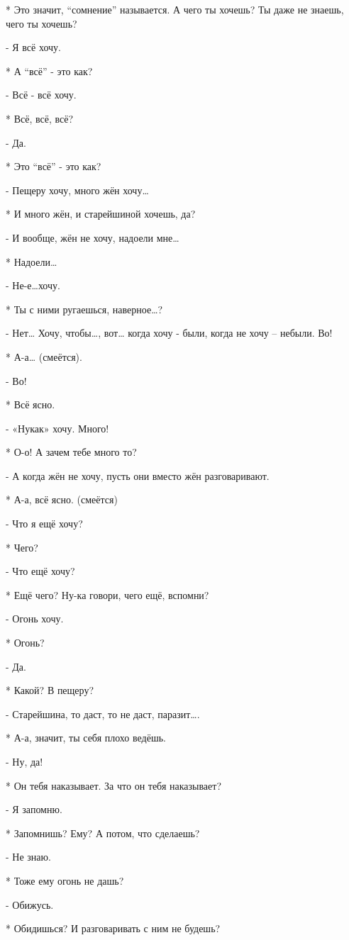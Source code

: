 * Это значит, “сомнение” называется. А чего ты хочешь? Ты даже не знаешь, чего ты хочешь?

- Я всё хочу.

* А “всё” - это как?

- Всё - всё хочу.

* Всё, всё, всё?

- Да.

* Это “всё” - это как?

- Пещеру хочу, много жён хочу…

* И много жён, и старейшиной хочешь, да?

- И вообще, жён не хочу, надоели мне…

* Надоели…

- Не-е…хочу.

* Ты с ними ругаешься, наверное…?

- Нет…  Хочу, чтобы…, вот… когда хочу - были, когда не хочу – небыли. Во!

* А-а… (смеётся).

- Во!

* Всё ясно.

- «Нукак» хочу. Много!

* О-о! А зачем тебе много то?

- А когда жён не хочу, пусть они вместо жён разговаривают.

* А-а, всё ясно. (смеётся)

- Что я ещё хочу?

* Чего?

- Что ещё хочу?

* Ещё чего? Ну-ка говори, чего ещё, вспомни?

- Огонь хочу.

* Огонь?

- Да.

* Какой? В пещеру?

-  Старейшина, то даст, то не даст, паразит….

* А-а, значит, ты себя плохо ведёшь.

- Ну, да!

* Он тебя наказывает. За что он тебя наказывает?

- Я запомню.

* Запомнишь? Ему? А потом, что сделаешь?

- Не знаю.

* Тоже ему огонь не дашь?

- Обижусь.

* Обидишься? И разговаривать с ним не будешь?


